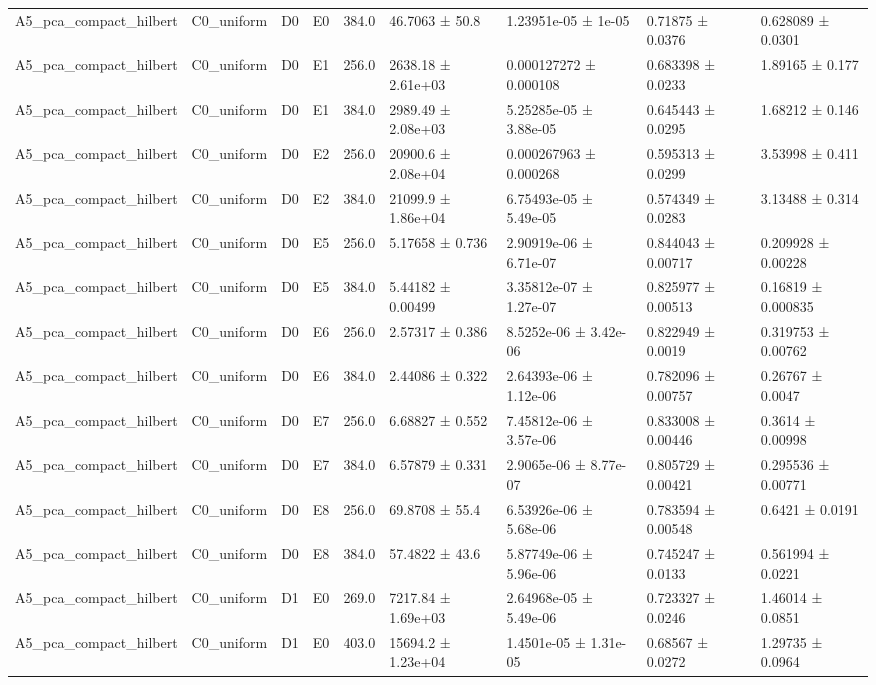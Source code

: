 \begin{table}
\begin{tabular}{lllllllll}
A5\_pca\_compact\_hilbert & C0\_uniform & D0 & E0 & 384.0 & 46.7063 ± 50.8 & 1.23951e-05 ± 1e-05 & 0.71875 ± 0.0376 & 0.628089 ± 0.0301 \\
A5\_pca\_compact\_hilbert & C0\_uniform & D0 & E1 & 256.0 & 2638.18 ± 2.61e+03 & 0.000127272 ± 0.000108 & 0.683398 ± 0.0233 & 1.89165 ± 0.177 \\
A5\_pca\_compact\_hilbert & C0\_uniform & D0 & E1 & 384.0 & 2989.49 ± 2.08e+03 & 5.25285e-05 ± 3.88e-05 & 0.645443 ± 0.0295 & 1.68212 ± 0.146 \\
A5\_pca\_compact\_hilbert & C0\_uniform & D0 & E2 & 256.0 & 20900.6 ± 2.08e+04 & 0.000267963 ± 0.000268 & 0.595313 ± 0.0299 & 3.53998 ± 0.411 \\
A5\_pca\_compact\_hilbert & C0\_uniform & D0 & E2 & 384.0 & 21099.9 ± 1.86e+04 & 6.75493e-05 ± 5.49e-05 & 0.574349 ± 0.0283 & 3.13488 ± 0.314 \\
A5\_pca\_compact\_hilbert & C0\_uniform & D0 & E5 & 256.0 & 5.17658 ± 0.736 & 2.90919e-06 ± 6.71e-07 & 0.844043 ± 0.00717 & 0.209928 ± 0.00228 \\
A5\_pca\_compact\_hilbert & C0\_uniform & D0 & E5 & 384.0 & 5.44182 ± 0.00499 & 3.35812e-07 ± 1.27e-07 & 0.825977 ± 0.00513 & 0.16819 ± 0.000835 \\
A5\_pca\_compact\_hilbert & C0\_uniform & D0 & E6 & 256.0 & 2.57317 ± 0.386 & 8.5252e-06 ± 3.42e-06 & 0.822949 ± 0.0019 & 0.319753 ± 0.00762 \\
A5\_pca\_compact\_hilbert & C0\_uniform & D0 & E6 & 384.0 & 2.44086 ± 0.322 & 2.64393e-06 ± 1.12e-06 & 0.782096 ± 0.00757 & 0.26767 ± 0.0047 \\
A5\_pca\_compact\_hilbert & C0\_uniform & D0 & E7 & 256.0 & 6.68827 ± 0.552 & 7.45812e-06 ± 3.57e-06 & 0.833008 ± 0.00446 & 0.3614 ± 0.00998 \\
A5\_pca\_compact\_hilbert & C0\_uniform & D0 & E7 & 384.0 & 6.57879 ± 0.331 & 2.9065e-06 ± 8.77e-07 & 0.805729 ± 0.00421 & 0.295536 ± 0.00771 \\
A5\_pca\_compact\_hilbert & C0\_uniform & D0 & E8 & 256.0 & 69.8708 ± 55.4 & 6.53926e-06 ± 5.68e-06 & 0.783594 ± 0.00548 & 0.6421 ± 0.0191 \\
A5\_pca\_compact\_hilbert & C0\_uniform & D0 & E8 & 384.0 & 57.4822 ± 43.6 & 5.87749e-06 ± 5.96e-06 & 0.745247 ± 0.0133 & 0.561994 ± 0.0221 \\
A5\_pca\_compact\_hilbert & C0\_uniform & D1 & E0 & 269.0 & 7217.84 ± 1.69e+03 & 2.64968e-05 ± 5.49e-06 & 0.723327 ± 0.0246 & 1.46014 ± 0.0851 \\
A5\_pca\_compact\_hilbert & C0\_uniform & D1 & E0 & 403.0 & 15694.2 ± 1.23e+04 & 1.4501e-05 ± 1.31e-05 & 0.68567 ± 0.0272 & 1.29735 ± 0.0964 \\

\end{tabular}
\end{table}
